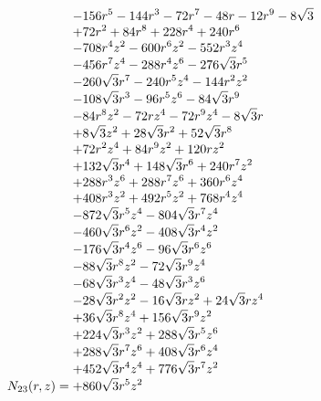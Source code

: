 \documentclass[11pt,a4paper]{article}
\begin{document}
\begin{equation}
N_{23}(r,z)=\shortstack[l]{$\displaystyle  - 156 r^{5} - 144 r^{3} - 72 r^{7} - 48 r - 12 r^{9} - 8 \sqrt{3}$\\
$\displaystyle  + 72 r^{2} + 84 r^{8} + 228 r^{4} + 240 r^{6}$\\
$\displaystyle  - 708 r^{4} z^{2} - 600 r^{6} z^{2} - 552 r^{3} z^{4}$\\
$\displaystyle  - 456 r^{7} z^{4} - 288 r^{4} z^{6} - 276 \sqrt{3} r^{5}$\\
$\displaystyle  - 260 \sqrt{3} r^{7} - 240 r^{5} z^{4} - 144 r^{2} z^{2}$\\
$\displaystyle  - 108 \sqrt{3} r^{3} - 96 r^{5} z^{6} - 84 \sqrt{3} r^{9}$\\
$\displaystyle  - 84 r^{8} z^{2} - 72 r z^{4} - 72 r^{9} z^{4} - 8 \sqrt{3} r$\\
$\displaystyle  + 8 \sqrt{3} z^{2} + 28 \sqrt{3} r^{2} + 52 \sqrt{3} r^{8}$\\
$\displaystyle  + 72 r^{2} z^{4} + 84 r^{9} z^{2} + 120 r z^{2}$\\
$\displaystyle  + 132 \sqrt{3} r^{4} + 148 \sqrt{3} r^{6} + 240 r^{7} z^{2}$\\
$\displaystyle  + 288 r^{3} z^{6} + 288 r^{7} z^{6} + 360 r^{6} z^{4}$\\
$\displaystyle  + 408 r^{3} z^{2} + 492 r^{5} z^{2} + 768 r^{4} z^{4}$\\
$\displaystyle  - 872 \sqrt{3} r^{5} z^{4} - 804 \sqrt{3} r^{7} z^{4}$\\
$\displaystyle  - 460 \sqrt{3} r^{6} z^{2} - 408 \sqrt{3} r^{4} z^{2}$\\
$\displaystyle  - 176 \sqrt{3} r^{4} z^{6} - 96 \sqrt{3} r^{6} z^{6}$\\
$\displaystyle  - 88 \sqrt{3} r^{8} z^{2} - 72 \sqrt{3} r^{9} z^{4}$\\
$\displaystyle  - 68 \sqrt{3} r^{3} z^{4} - 48 \sqrt{3} r^{3} z^{6}$\\
$\displaystyle  - 28 \sqrt{3} r^{2} z^{2} - 16 \sqrt{3} r z^{2} + 24 \sqrt{3} r z^{4}$\\
$\displaystyle  + 36 \sqrt{3} r^{8} z^{4} + 156 \sqrt{3} r^{9} z^{2}$\\
$\displaystyle  + 224 \sqrt{3} r^{3} z^{2} + 288 \sqrt{3} r^{5} z^{6}$\\
$\displaystyle  + 288 \sqrt{3} r^{7} z^{6} + 408 \sqrt{3} r^{6} z^{4}$\\
$\displaystyle  + 452 \sqrt{3} r^{4} z^{4} + 776 \sqrt{3} r^{7} z^{2}$\\
$\displaystyle  + 860 \sqrt{3} r^{5} z^{2}$}
\label{eq:cat-numerator-23}
\end{equation}
\end{document}
